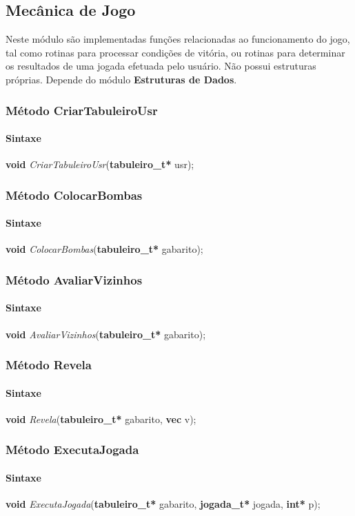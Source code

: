 \documentclass[10pt,a4paper]{report}
\begin{document}
\subsection{Mecânica de Jogo}
Neste módulo são implementadas funções relacionadas ao funcionamento do jogo, tal como rotinas para processar condições de vitória, ou rotinas para determinar os resultados de uma jogada efetuada pelo usuário. Não possui estruturas próprias. Depende do módulo \textbf{Estruturas de Dados}.
\subsubsection{Método CriarTabuleiroUsr}
\paragraph{Sintaxe}
\textbf{void} {\it CriarTabuleiroUsr}(\textbf{tabuleiro\_t*} usr);
\subsubsection{Método ColocarBombas}
\paragraph{Sintaxe}
\textbf{void} {\it ColocarBombas}(\textbf{tabuleiro\_t*} gabarito);
\subsubsection{Método AvaliarVizinhos}
\paragraph{Sintaxe}
\textbf{void} {\it AvaliarVizinhos}(\textbf{tabuleiro\_t*} gabarito);
\subsubsection{Método Revela}
\paragraph{Sintaxe}
\textbf{void} {\it Revela}(\textbf{tabuleiro\_t*} gabarito, \textbf{vec} v);
\subsubsection{Método ExecutaJogada}
\paragraph{Sintaxe}
\textbf{void} {\it ExecutaJogada}(\textbf{tabuleiro\_t*} gabarito, \textbf{jogada\_t*} jogada, \textbf{int*} p);
\end{document}
